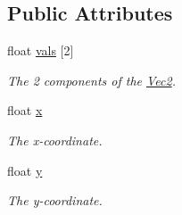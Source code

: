 \subsection*{Public Attributes}
\begin{DoxyCompactItemize}
\item 
float \hyperlink{classgfxmath_1_1_vec2_a7ea0d3fc8b8a22e4358c9dff904480ab}{vals} \mbox{[}2\mbox{]}
\begin{DoxyCompactList}\small\item\em The 2 components of the \hyperlink{classgfxmath_1_1_vec2}{Vec2}. \end{DoxyCompactList}\item 
float \hyperlink{classgfxmath_1_1_vec2_ae822579debf2a7b9aab468fbb4ce218d}{x}
\begin{DoxyCompactList}\small\item\em The x-\/coordinate. \end{DoxyCompactList}\item 
float \hyperlink{classgfxmath_1_1_vec2_acfad5fd06cb37b0e0e5373f286e7d474}{y}
\begin{DoxyCompactList}\small\item\em The y-\/coordinate. \end{DoxyCompactList}\end{DoxyCompactItemize}
